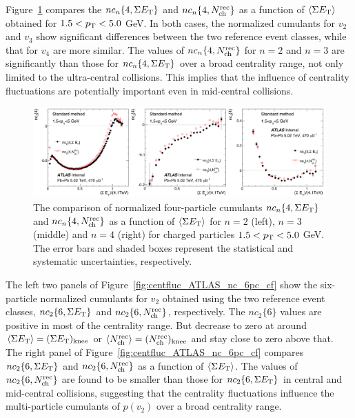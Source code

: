 Figure~\ref{fig:centfluc_ATLAS_nc_4pc_cf2} compares the $nc_n\{4, \Sigma E_\text{T}\}$ and $nc_n\{4, N_\text{ch}^\text{rec}\}$ as a function of $\left\langle \Sigma E_\text{T}\right\rangle$ obtained for $1.5<p_\text{T}<5.0$ GeV. In both cases, the normalized cumulants for $v_2$ and $v_3$ show significant differences between the two reference event classes, while that for $v_4$ are more similar. The values of $nc_n\{4, N_\text{ch}^\text{rec}\}$ for $n=2$ and $n=3$ are significantly than those for $nc_n\{4, \Sigma E_\text{T}\}$ over a broad centrality range, not only limited to the ultra-central collisions. This implies that the influence of centrality fluctuations are potentially important even in mid-central collisions.

\begin{figure}[H]
\centering
\includegraphics[width=.95\linewidth]{figs/chapter_centfluc/ATLAS_nc_4pc_cf2.png}
\caption{The comparison of normalized four-particle cumulants $nc_n\{4, \Sigma E_\text{T}\}$ and $nc_n\{4, N_\text{ch}^\text{rec}\}$ as a function of $\left\langle \Sigma E_\text{T}\right\rangle$ for $n=2$ (left), $n=3$ (middle) and $n=4$ (right) for charged particles $1.5<p_\text{T}<5.0$ GeV. The error bars and shaded boxes represent the statistical and systematic uncertainties, respectively.}
\label{fig:centfluc_ATLAS_nc_4pc_cf2}
\end{figure}

The left two panels of Figure~\ref{fig:centfluc_ATLAS_nc_6pc_cf} show the six-particle normalized cumulants for $v_2$ obtained using the two reference event classes, $nc_2\{6, \Sigma E_\text{T}\}$ and $nc_2\{6, N_\text{ch}^\text{rec}\}$, respectively. The $nc_2\{6\}$ values are positive in most of the centrality range. But decrease to zero at around $\left\langle \Sigma E_\text{T}\right\rangle = (\Sigma E_\text{T})_\text{knee}$ or $\left\langle N_\text{ch}^\text{rec}\right\rangle = (N_\text{ch}^\text{rec})_\text{knee}$ and stay close to zero above that. The right panel of Figure~\ref{fig:centfluc_ATLAS_nc_6pc_cf} compares $nc_2\{6, \Sigma E_\text{T}\}$ and $nc_2\{6, N_\text{ch}^\text{rec}\}$ as a function of $\left\langle \Sigma E_\text{T}\right\rangle$. The values of $nc_2\{6, N_\text{ch}^\text{rec}\}$ are found to be smaller than those for $nc_2\{6, \Sigma E_\text{T}\}$ in central and mid-central collisions, suggesting that the centrality  fluctuations influence the multi-particle cumulants of $p(v_2)$ over a broad centrality range.

